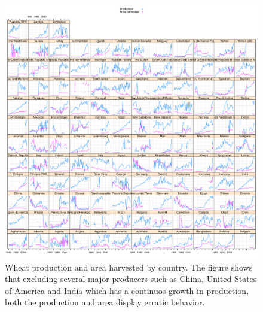 \documentclass[nojss]{jss}\usepackage[]{graphicx}\usepackage[]{color}
\makeatletter
\def\maxwidth{ %
  \ifdim\Gin@nat@width>\linewidth
    \linewidth
  \else
    \Gin@nat@width
  \fi
}
\newenvironment{knitrout}{}{} %
\makeatother
\begin{document}
\begin{knitrout}
\color{fgcolor}\begin{figure}[!ht]


{\centering \includegraphics[width=\maxwidth]{figure/wheat-production-area-explore} 

}

\caption[Wheat production and area harvested by country]{Wheat production and area harvested by country. The figure shows that excluding several major producers such as China, United States of America and India which has a continuos growth in production, both the production and area display erratic behavior.\label{fig:wheat-production-area-explore}}
\end{figure}


\end{knitrout}
\end{document}
